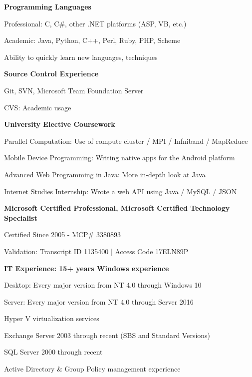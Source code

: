 \documentclass[10pt]{article}
\begin{document}
\begin{innerlist}
  \item[] \textbf{Programming Languages}
  \begin{innerlist}
    \item Professional: C, C\#, other .NET platforms (ASP, VB, etc.)
    \item Academic: Java, Python, C++, Perl, Ruby, PHP, Scheme
    \item Ability to quickly learn new languages, techniques
  \end{innerlist}

  \item[] \textbf{Source Control Experience}
  \begin{innerlist}
    \item Git, SVN, Microsoft Team Foundation Server
    \item CVS: Academic usage
  \end{innerlist}
  
  \item[] \textbf{University Elective Coursework}
  \begin{innerlist}
    \item Parallel Computation: Use of compute cluster / MPI / Infniband / MapReduce
    \item Mobile Device Programming: Writing native apps for the Android platform
    \item Advanced Web Programming in Java: More in-depth look at Java
    \item Internet Studies Internship: Wrote a web API using Java / MySQL / JSON
  \end{innerlist}

  \item[] \textbf{Microsoft Certified Professional, Microsoft Certified Technology Specialist}
  \begin{innerlist}
    \item Certified Since 2005 - MCP\# 3380893
    \item Validation: Transcript ID 1135400 | Access Code 17ELN89P
  \end{innerlist}

  \item[] \textbf{IT Experience: 15+ years Windows experience}
  \begin{innerlist}
    \item Desktop: Every major version from NT 4.0 through Windows 10
    \item Server: Every major version from NT 4.0 through Server 2016
    \item Hyper V virtualization services
    \item Exchange Server 2003 through recent (SBS and Standard Versions)
    \item SQL Server 2000 through recent
	\item Active Directory \& Group Policy management experience
  \end{innerlist}


\end{innerlist}
\end{document}

